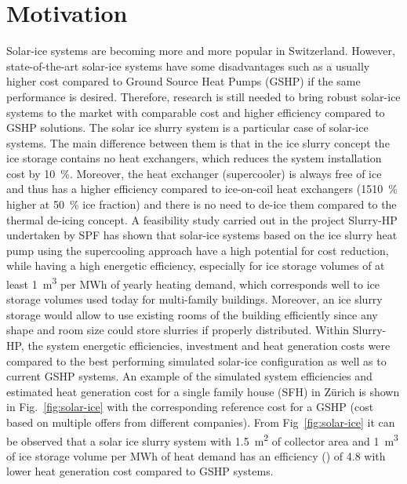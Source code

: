 \documentclass[english]{SFOEYearlyReportEnglish_2018}
\begin{document}
 

%


\section{Motivation}

Solar-ice systems are becoming more and more popular in Switzerland. However, state-of-the-art solar-ice systems have some disadvantages such as a usually higher cost compared to Ground Source Heat Pumps (GSHP) if the same performance is desired. Therefore, research is still needed to bring robust solar-ice systems to the market with comparable cost and higher efficiency compared to GSHP solutions. 
The solar ice slurry system is a particular case of solar-ice systems. The main difference between them is that in the ice slurry concept the ice storage contains no heat exchangers, which reduces the system installation cost by \SI{10}{\%}. Moreover, the heat exchanger (supercooler) is always free of ice and thus has a higher efficiency compared to ice-on-coil heat exchangers (15\SI{10}{\%} higher at \SI{50}{\%} ice fraction) and there is no need to de-ice them compared to the thermal de-icing concept. A feasibility study carried out in the project Slurry-HP undertaken by SPF \citep{SlurryHp_2017} has shown that solar-ice systems based on the ice slurry heat pump using the supercooling approach have a high potential for cost reduction, while having a high energetic efficiency, especially for ice storage volumes of at least \SI{1}{m^3} per MWh of yearly heating demand, which corresponds well to ice storage volumes used today for multi-family buildings. Moreover, an ice slurry storage would allow to use existing rooms of the building efficiently since any shape and room size could store slurries if properly distributed.
Within Slurry-HP, the system energetic efficiencies, investment and heat generation costs were compared to the best performing simulated solar-ice configuration as well as to current GSHP systems. An example of the simulated system efficiencies and estimated heat generation cost for a single family house (SFH) in Z\"urich is shown in Fig.~\ref{fig:solar-ice} with the corresponding reference cost for a GSHP (cost based on multiple offers from different companies). From Fig~\ref{fig:solar-ice} it can be observed that a solar ice slurry system with \SI{1.5}{m^2} of collector area and \SI{1}{m^3} of ice storage volume per MWh of heat demand has an efficiency (\si{\spf}) of 4.8 with lower heat generation cost compared to GSHP systems.
\end{document}
